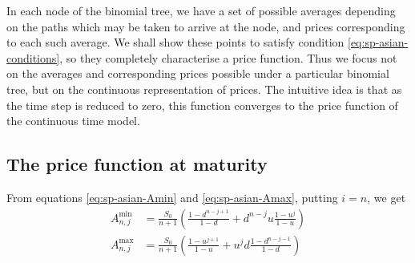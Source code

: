 In each node of the binomial tree, we have a set of possible averages depending on the paths which may be taken to arrive at the node, and prices corresponding to each such average. We shall show these points to satisfy condition \ref{eq:sp-asian-conditions}, so they completely characterise a price function. Thus we focus not on the averages and corresponding prices possible under a particular binomial tree, but on the continuous representation of prices. The intuitive idea is that as the time step is reduced to zero, this function converges to the price function of the continuous time model.





\subsection{The price function at maturity}
\label{subsec:sp-asian-eu-price-maturity}

From equations \ref{eq:sp-asian-Amin} and \ref{eq:sp-asian-Amax}, putting $i = n$, we get
\begin{align*}
	A_{n,j}^{\min} &= \frac{S_0}{n+1} \left( \frac{1 - d^{n-j+1}}{1-d} + d^{n-j} u \frac{1 - u^{j}}{1-u} \right) \\
	A_{n,j}^{\max} &= \frac{S_0}{n+1} \left( \frac{1 - u^{j+1}}{1-u} + u^{j} d \frac{1 - d^{n-j-1}}{1-d} \right)
\end{align*}

